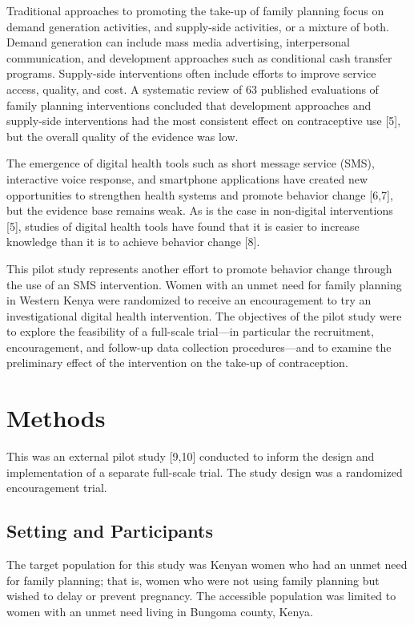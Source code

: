 \documentclass[man]{apa6}
\theoremstyle{definition}
\theoremstyle{definition}
\theoremstyle{definition}
\theoremstyle{remark}
\begin{document}
Traditional approaches to promoting the take-up of family planning focus
on demand generation activities, and supply-side activities, or a
mixture of both. Demand generation can include mass media advertising,
interpersonal communication, and development approaches such as
conditional cash transfer programs. Supply-side interventions often
include efforts to improve service access, quality, and cost. A
systematic review of 63 published evaluations of family planning
interventions concluded that development approaches and supply-side
interventions had the most consistent effect on contraceptive use
{[}5{]}, but the overall quality of the evidence was low.

The emergence of digital health tools such as short message service
(SMS), interactive voice response, and smartphone applications have
created new opportunities to strengthen health systems and promote
behavior change {[}6,7{]}, but the evidence base remains weak. As is the
case in non-digital interventions {[}5{]}, studies of digital health
tools have found that it is easier to increase knowledge than it is to
achieve behavior change {[}8{]}.

This pilot study represents another effort to promote behavior change
through the use of an SMS intervention. Women with an unmet need for
family planning in Western Kenya were randomized to receive an
encouragement to try an investigational digital health intervention. The
objectives of the pilot study were to explore the feasibility of a
full-scale trial---in particular the recruitment, encouragement, and
follow-up data collection procedures---and to examine the preliminary
effect of the intervention on the take-up of contraception.

\hypertarget{methods}{%
\section{Methods}\label{methods}}

This was an external pilot study {[}9,10{]} conducted to inform the
design and implementation of a separate full-scale trial. The study
design was a randomized encouragement trial.

\hypertarget{setting-and-participants}{%
\subsection{Setting and Participants}\label{setting-and-participants}}

The target population for this study was Kenyan women who had an unmet
need for family planning; that is, women who were not using family
planning but wished to delay or prevent pregnancy. The accessible
population was limited to women with an unmet need living in Bungoma
county, Kenya.
\end{document}
